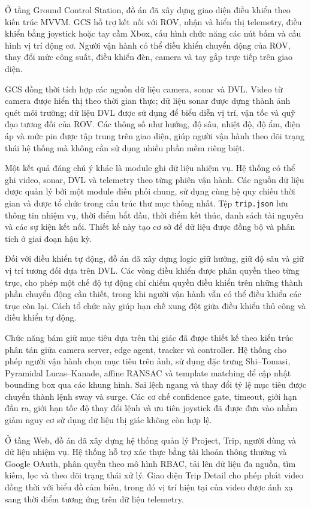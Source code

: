 \documentclass[../DoAn.tex]{subfiles}
\begin{document}
Ở tầng Ground Control Station, đồ án đã xây dựng giao diện điều khiển theo kiến trúc MVVM. GCS hỗ trợ kết nối với ROV, nhận và hiển thị telemetry, điều khiển bằng joystick hoặc tay cầm Xbox, cấu hình chức năng các nút bấm và cấu hình vị trí động cơ. Người vận hành có thể điều khiển chuyển động của ROV, thay đổi mức công suất, điều khiển đèn, camera và tay gắp trực tiếp trên giao diện.

GCS đồng thời tích hợp các nguồn dữ liệu camera, sonar và DVL. Video từ camera được hiển thị theo thời gian thực; dữ liệu sonar được dựng thành ảnh quét môi trường; dữ liệu DVL được sử dụng để biểu diễn vị trí, vận tốc và quỹ đạo tương đối của ROV. Các thông số như hướng, độ sâu, nhiệt độ, độ ẩm, điện áp và mức pin được tập trung trên giao diện, giúp người vận hành theo dõi trạng thái hệ thống mà không cần sử dụng nhiều phần mềm riêng biệt.

Một kết quả đáng chú ý khác là module ghi dữ liệu nhiệm vụ. Hệ thống có thể ghi video, sonar, DVL và telemetry theo từng phiên vận hành. Các nguồn dữ liệu được quản lý bởi một module điều phối chung, sử dụng cùng hệ quy chiếu thời gian và được tổ chức trong cấu trúc thư mục thống nhất. Tệp \texttt{trip.json} lưu thông tin nhiệm vụ, thời điểm bắt đầu, thời điểm kết thúc, danh sách tài nguyên và các sự kiện kết nối. Thiết kế này tạo cơ sở để dữ liệu được đồng bộ và phân tích ở giai đoạn hậu kỳ.

Đối với điều khiển tự động, đồ án đã xây dựng logic giữ hướng, giữ độ sâu và giữ vị trí tương đối dựa trên DVL. Các vòng điều khiển được phân quyền theo từng trục, cho phép một chế độ tự động chỉ chiếm quyền điều khiển trên những thành phần chuyển động cần thiết, trong khi người vận hành vẫn có thể điều khiển các trục còn lại. Cách tổ chức này giúp hạn chế xung đột giữa điều khiển thủ công và điều khiển tự động.

Chức năng bám giữ mục tiêu dựa trên thị giác đã được thiết kế theo kiến trúc phân tán giữa camera server, edge agent, tracker và controller. Hệ thống cho phép người vận hành chọn mục tiêu trên ảnh, sử dụng đặc trưng Shi--Tomasi, Pyramidal Lucas--Kanade, affine RANSAC và template matching để cập nhật bounding box qua các khung hình. Sai lệch ngang và thay đổi tỷ lệ mục tiêu được chuyển thành lệnh sway và surge. Các cơ chế confidence gate, timeout, giới hạn đầu ra, giới hạn tốc độ thay đổi lệnh và ưu tiên joystick đã được đưa vào nhằm giảm nguy cơ sử dụng dữ liệu thị giác không còn hợp lệ.

Ở tầng Web, đồ án đã xây dựng hệ thống quản lý Project, Trip, người dùng và dữ liệu nhiệm vụ. Hệ thống hỗ trợ xác thực bằng tài khoản thông thường và Google OAuth, phân quyền theo mô hình RBAC, tải lên dữ liệu đa nguồn, tìm kiếm, lọc và theo dõi trạng thái xử lý. Giao diện Trip Detail cho phép phát video đồng thời với biểu đồ cảm biến, trong đó vị trí hiện tại của video được ánh xạ sang thời điểm tương ứng trên dữ liệu telemetry.
\end{document}
